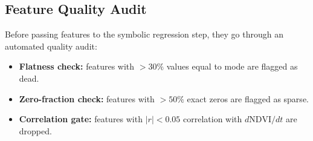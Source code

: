 \documentclass[12pt, a4paper]{article}
\begin{document}

\subsection{Feature Quality Audit}

Before passing features to the symbolic regression step, they go through an automated quality audit:
\begin{itemize}[leftmargin=1.4em]
    \item \textbf{Flatness check:} features with $>30\%$ values equal to mode are flagged as dead.
    \item \textbf{Zero-fraction check:} features with $>50\%$ exact zeros are flagged as sparse.
    \item \textbf{Correlation gate:} features with $|r| < 0.05$ correlation with $d\text{NDVI}/dt$ are dropped.
\end{itemize}
\end{document}
